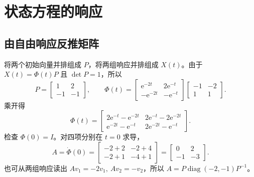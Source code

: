 \chapter{状态方程的响应}

\section{由自由响应反推矩阵}



\sol 将两个初始向量并排组成 $P$，将两组响应并排组成 $X(t)$。由于 $X(t)=\Phi(t)P$ 且 $\det P=1$，所以
\[
P=\begin{bmatrix}1&2\\-1&-1\end{bmatrix},\qquad
\Phi(t)=
\begin{bmatrix}\mathrm e^{-2t}&2\mathrm e^{-t}\\-\mathrm e^{-2t}&-\mathrm e^{-t}\end{bmatrix}
\begin{bmatrix}-1&-2\\1&1\end{bmatrix}.
\]
乘开得
\[
\Phi(t)=\begin{bmatrix}
2\mathrm e^{-t}-\mathrm e^{-2t} & 2\mathrm e^{-t}-2\mathrm e^{-2t}\\
\mathrm e^{-2t}-\mathrm e^{-t} & 2\mathrm e^{-2t}-\mathrm e^{-t}
\end{bmatrix}.
\]
检查 $\Phi(0)=I$。对四项分别在 $t=0$ 求导，
\[
A=\dot\Phi(0)=\begin{bmatrix}-2+2&-2+4\\-2+1&-4+1\end{bmatrix}
=\begin{bmatrix}0&2\\-1&-3\end{bmatrix}.
\]
也可从两组响应读出 $Av_1=-2v_1,\ Av_2=-v_2$，所以 $A=P\operatorname{diag}(-2,-1)P^{-1}$。

